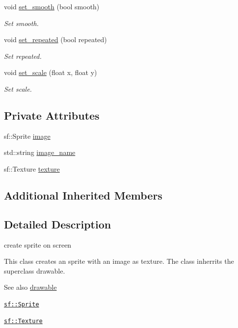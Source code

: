 \begin{DoxyCompactItemize}
void \hyperlink{classimage__from__file_a2d808924e71e3eaf18532d9b32e40f07}{set\+\_\+smooth} (bool smooth)
\begin{DoxyCompactList}\small\item\em Set smooth. \end{DoxyCompactList}\item 
void \hyperlink{classimage__from__file_abaf0ebde2771171fdf91b55f4f6c5aa6}{set\+\_\+repeated} (bool repeated)
\begin{DoxyCompactList}\small\item\em Set repeated. \end{DoxyCompactList}\item 
void \hyperlink{classimage__from__file_a698cd91783bb6c2211ea5a3702ca60a8}{set\+\_\+scale} (float x, float y)
\begin{DoxyCompactList}\small\item\em Set scale. \end{DoxyCompactList}\end{DoxyCompactItemize}
\subsection*{Private Attributes}
\begin{DoxyCompactItemize}
\item 
sf\+::\+Sprite \hyperlink{classimage__from__file_a3c284697aa8a74be146dbe6429c2e66d}{image}
\item 
std\+::string \hyperlink{classimage__from__file_a236ad235d4ef465070466a1c2f524a8e}{image\+\_\+name}
\item 
sf\+::\+Texture \hyperlink{classimage__from__file_acb9ae2f3e9e14f8626738700efcb9826}{texture}
\end{DoxyCompactItemize}
\subsection*{Additional Inherited Members}


\subsection{Detailed Description}
create sprite on screen 

This class creates an sprite with an image as texture. The class inherrits the superclass drawable.

\begin{DoxySeeAlso}{See also}
\hyperlink{classdrawable}{drawable} 

\href{https://www.sfml-dev.org/documentation/2.0/classsf_1_1Sprite.php }{\tt sf\+::\+Sprite} 

\href{https://www.sfml-dev.org/documentation/2.0/classsf_1_1Texture.php}{\tt sf\+::\+Texture} 
\end{DoxySeeAlso}


